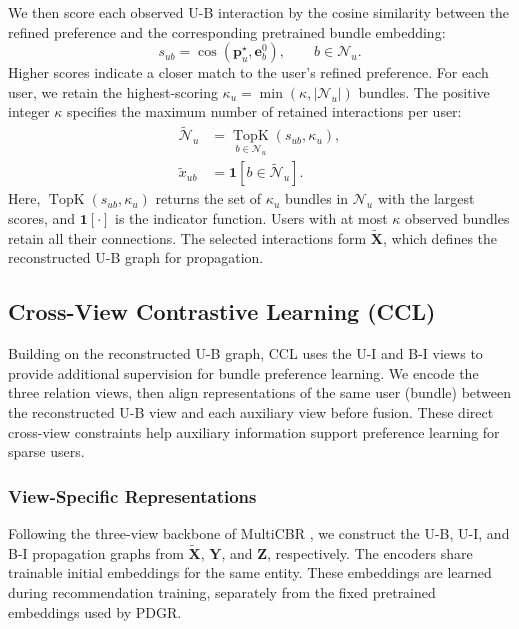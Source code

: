 \documentclass[letterpaper]{article}
\begin{document}
We then score each observed U-B interaction by the cosine similarity between the refined preference and the corresponding pretrained bundle embedding:
\begin{equation}
s_{ub}
=\cos(\mathbf p_u^\star,\mathbf e_b^0),
\qquad b\in\mathcal N_u.
\tag{10}
\end{equation}
Higher scores indicate a closer match to the user's refined preference. For each user, we retain the highest-scoring $\kappa_u=\min(\kappa,|\mathcal N_u|)$ bundles. The positive integer $\kappa$ specifies the maximum number of retained interactions per user:
\begin{equation}
\begin{aligned}
\widetilde{\mathcal N}_u
&=\underset{b\in\mathcal N_u}{\operatorname{TopK}}
\left(s_{ub},\kappa_u\right),\\
\widetilde x_{ub}
&=\mathbf 1\!\left[b\in\widetilde{\mathcal N}_u\right].
\end{aligned}
\tag{11}
\end{equation}
Here, $\operatorname{TopK}(s_{ub},\kappa_u)$ returns the set of $\kappa_u$ bundles in $\mathcal N_u$ with the largest scores, and $\mathbf 1[\cdot]$ is the indicator function. Users with at most $\kappa$ observed bundles retain all their connections. The selected interactions form $\widetilde{\mathbf X}$, which defines the reconstructed U-B graph for propagation.

\subsection{Cross-View Contrastive Learning (CCL)}

Building on the reconstructed U-B graph, CCL uses the U-I and B-I views to provide additional supervision for bundle preference learning. We encode the three relation views, then align representations of the same user (bundle) between the reconstructed U-B view and each auxiliary view before fusion. These direct cross-view constraints help auxiliary information support preference learning for sparse users.

\subsubsection{View-Specific Representations}

Following the three-view backbone of MultiCBR \cite{ma2024multicbr}, we construct the U-B, U-I, and B-I propagation graphs from $\widetilde{\mathbf X}$, $\mathbf Y$, and $\mathbf Z$, respectively. The encoders share trainable initial embeddings for the same entity. These embeddings are learned during recommendation training, separately from the fixed pretrained embeddings used by PDGR.
\end{document}
